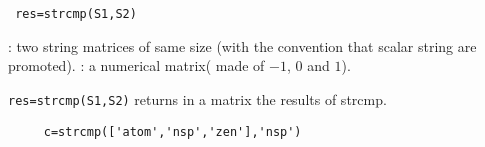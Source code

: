 
\begin{mandesc}
\end{mandesc}
\begin{calling_sequence}
\begin{verbatim}
 res=strcmp(S1,S2)  
\end{verbatim}
\end{calling_sequence}
\begin{parameters}
  \begin{varlist}
    : two string matrices of same size (with the convention that
  scalar string are promoted).
    : a numerical matrix( made of $-1$, $0$ and $1$).
  \end{varlist}
\end{parameters}
\begin{mandescription}
  \verb!res=strcmp(S1,S2)! returns in a matrix the results of strcmp.
\end{mandescription}
\begin{examples}
  \begin{Verbatim}
     c=strcmp(['atom','nsp','zen'],'nsp')
  \end{Verbatim}
\end{examples}
\begin{manseealso}
\end{manseealso}

